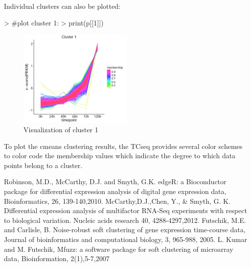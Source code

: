 \documentclass[a4paper]{article}
\begin{document}
Individual clusters can also be plotted:
\begin{Schunk}
\begin{Sinput}
> #plot cluster 1:
> print(p[[1]])
\end{Sinput}
\end{Schunk}
\begin{figure}[H]
\centering
        \includegraphics[width=0.5\textwidth]{subcluster.png}
    \caption{Visualization of cluster 1}
\end{figure}

To plot the cmeans clustering results, the TCseq provides several color schemes to color code the membership values which indicate the degree to which data points belong to a cluster.

\begin{thebibliography}{9}
 Robinson, M.D., McCarthy, D.J. and Smyth, G.K. edgeR: a Bioconductor package for differential expression analysis of digital gene expression data, Bioinformatics, 26, 139-140,2010.
 McCarthy,D.J.,Chen, Y., & Smyth, G. K. Differential expression analysis of multifactor RNA-Seq experiments with respect to biological variation. Nucleic acids research 40, 4288-4297,2012.
 Futschik, M.E. and Carlisle, B. Noise-robust soft clustering of gene expression time-course data, Journal of bioinformatics and computational biology, 3, 965-988, 2005.
 L. Kumar and M. Futschik, Mfuzz: a software package for soft clustering of microarray data, Bioinformation, 2(1),5-7,2007

\end{thebibliography}
\end{document}
